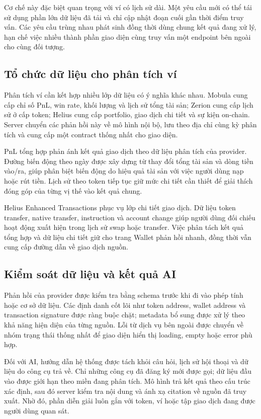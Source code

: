 Cơ chế này đặc biệt quan trọng với ví có lịch sử dài. Một yêu cầu mới có thể tái sử dụng phần lớn dữ liệu đã tải và chỉ cập nhật đoạn cuối gần thời điểm truy vấn. Các yêu cầu trùng nhau phát sinh đồng thời dùng chung kết quả đang xử lý, hạn chế việc nhiều thành phần giao diện cùng truy vấn một endpoint bên ngoài cho cùng đối tượng.

\subsection{Tổ chức dữ liệu cho phân tích ví}

Phân tích ví cần kết hợp nhiều lớp dữ liệu có ý nghĩa khác nhau. Mobula cung cấp chỉ số PnL, win rate, khối lượng và lịch sử tổng tài sản; Zerion cung cấp lịch sử ở cấp token; Helius cung cấp portfolio, giao dịch chi tiết và sự kiện on-chain. Server chuyển các phản hồi này về mô hình nội bộ, lưu theo địa chỉ cùng kỳ phân tích và cung cấp một contract thống nhất cho giao diện.

PnL tổng hợp phản ánh kết quả giao dịch theo dữ liệu phân tích của provider. Đường biến động theo ngày được xây dựng từ thay đổi tổng tài sản và dòng tiền vào/ra, giúp phân biệt biến động do hiệu quả tài sản với việc người dùng nạp hoặc rút tiền. Lịch sử theo token tiếp tục giữ mức chi tiết cần thiết để giải thích đóng góp của từng vị thế vào kết quả chung.

Helius Enhanced Transactions phục vụ lớp chi tiết giao dịch. Dữ liệu token transfer, native transfer, instruction và account change giúp người dùng đối chiếu hoạt động xuất hiện trong lịch sử swap hoặc transfer. Việc phân tách kết quả tổng hợp và dữ liệu chi tiết giữ cho trang Wallet phản hồi nhanh, đồng thời vẫn cung cấp đường dẫn về giao dịch nguồn.

\subsection{Kiểm soát dữ liệu và kết quả AI}

Phản hồi của provider được kiểm tra bằng schema trước khi đi vào phép tính hoặc cơ sở dữ liệu. Các định danh cốt lõi như token address, wallet address và transaction signature được ràng buộc chặt; metadata bổ sung được xử lý theo khả năng hiện diện của từng nguồn. Lỗi từ dịch vụ bên ngoài được chuyển về nhóm trạng thái thống nhất để giao diện hiển thị loading, empty hoặc error phù hợp.

Đối với AI, hướng dẫn hệ thống được tách khỏi câu hỏi, lịch sử hội thoại và dữ liệu do công cụ trả về. Chỉ những công cụ đã đăng ký mới được gọi; dữ liệu đầu vào được giới hạn theo miền đang phân tích. Mô hình trả kết quả theo cấu trúc xác định, sau đó server kiểm tra nội dung và ánh xạ citation về nguồn đã truy xuất. Nhờ đó, phần diễn giải luôn gắn với token, ví hoặc tập giao dịch đang được người dùng quan sát.

